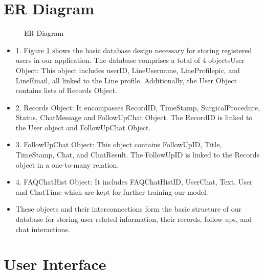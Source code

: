 \documentclass[12pt,oneside,openright,a4paper]{cpe-english-project}
\begin{document}
  \section{ER Diagram}
    \begin{figure}[!h]
      \centering
      \caption{ER-Diagram}\label{fig:ER}
    \end{figure}
    \begin{itemize}
      \item[] 1. Figure \ref{fig:ER} shows the basic database design necessary for storing registered users in our application. The database comprises a total of 4 objectsUser Object: This object includes userID, LineUsername, LineProfilepic, and LineEmail, all linked to the Line profile. Additionally, the User Object contains lists of Records Object.
      \item[] 2. Records Object: It encompasses RecordID, TimeStamp, SurgicalProcedure, Status, ChatMessage and FollowUpChat Object. The RecordID is linked to the User object and FollowUpChat Object.
      \item[] 3. FollowUpChat Object: This object contains FollowUpID, Title, TimeStamp, Chat, and ChatResult. The FollowUpID is linked to the Records object in a one-to-many relation.
      \item[] 4. FAQChatHist Object: It includes FAQChatHistID, UserChat, Text, User and ChatTime which are kept for further training our model.
      \item[] These objects and their interconnections form the basic structure of our database for storing user-related information, their records, follow-ups, and chat interactions.
    \end{itemize}

  \section{User Interface}
\end{document}
